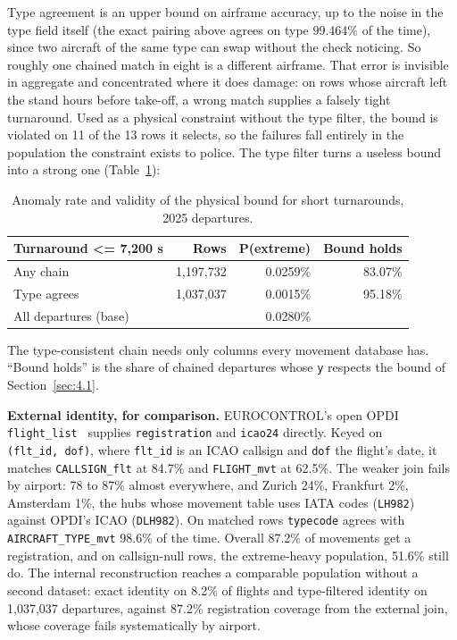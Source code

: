 \documentclass[
  manuscript=article,
  layout=preprint,
  year=2026,
  volume=x,
]{extra/joas}
\begin{document}
Type agreement is an upper bound on airframe accuracy, up to the noise in the type field itself (the exact pairing above agrees on type 99.464\% of the time), since two aircraft of the same type can swap without the check noticing. So roughly one chained match in eight is a different airframe. That error is invisible in aggregate and concentrated where it does damage: on rows whose aircraft left the stand hours before take-off, a wrong match supplies a falsely tight turnaround. Used as a physical constraint without the type filter, the bound is violated on 11 of the 13 rows it selects, so the failures fall entirely in the population the constraint exists to police. The type filter turns a useless bound into a strong one (Table~\ref{tab:22}):

\begin{table}[htbp!]
  \centering
  \small
  \setlength{\tabcolsep}{5pt}\renewcommand{\arraystretch}{1.15}
  \caption{Anomaly rate and validity of the physical bound for short turnarounds, 2025 departures.}
  \label{tab:22}
  \begin{tabular*}{\linewidth}{@{\extracolsep{\fill}}lrrr}
  \toprule
  \textbf{Turnaround \textless= 7,200 s} & \textbf{Rows} & \textbf{P(extreme)} & \textbf{Bound holds} \\
  \midrule
  Any chain & 1,197,732 & 0.0259\% & 83.07\% \\
  Type agrees & 1,037,037 & 0.0015\% & 95.18\% \\
  All departures (base) &  & 0.0280\% &  \\
  \bottomrule
  \end{tabular*}
\end{table}

The type-consistent chain needs only columns every movement database has. ``Bound holds'' is the share of chained departures whose \texttt{y} respects the bound of Section~\ref{sec:4.1}.

\textbf{External identity, for comparison.} EUROCONTROL's open OPDI \texttt{flight\_list}~\cite{opdi_flight_list} supplies \texttt{registration} and \texttt{icao24} directly. Keyed on \texttt{(flt\_id,\ dof)}, where \texttt{flt\_id} is an ICAO callsign and \texttt{dof} the flight's date, it matches \texttt{CALLSIGN\_flt} at 84.7\% and \texttt{FLIGHT\_mvt} at 62.5\%. The weaker join fails by airport: 78 to 87\% almost everywhere, and Zurich 24\%, Frankfurt 2\%, Amsterdam 1\%, the hubs whose movement table uses IATA codes (\texttt{LH982}) against OPDI's ICAO (\texttt{DLH982}). On matched rows \texttt{typecode} agrees with \texttt{AIRCRAFT\_TYPE\_mvt} 98.6\% of the time. Overall 87.2\% of movements get a registration, and on callsign-null rows, the extreme-heavy population, 51.6\% still do. The internal reconstruction reaches a comparable population without a second dataset: exact identity on 8.2\% of flights and type-filtered identity on 1,037,037 departures, against 87.2\% registration coverage from the external join, whose coverage fails systematically by airport.
\end{document}
